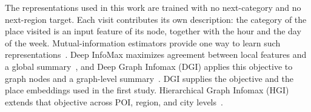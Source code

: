 The representations used in this work are trained with no next-category and no
next-region target. Each visit contributes its own description: the category of
the place visited is an input feature of its node, together with the hour and the day
of the week.
Mutual-information estimators provide one way to learn such
representations~\cite{belghazi2018mine}. Deep InfoMax maximizes agreement between
local features and a global summary~\cite{hjelm2019dim}, and Deep Graph Infomax (DGI)
applies this objective to graph nodes and a graph-level
summary~\cite{velickovic2019deep}. DGI supplies the objective and the place embeddings
used in the first study. Hierarchical Graph Infomax (HGI) extends that objective
across POI, region, and city levels~\cite{huang2023hgi}.

